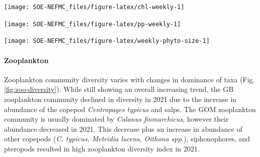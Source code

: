 \documentclass[
  10pt,
]{article}
\let\origfigure\figure
\let\endorigfigure\endfigure
\renewenvironment{figure}[1][2] {
    \expandafter\origfigure\expandafter[H]
} {
    \endorigfigure
}
\begin{document}
\begin{figure}

{\centering \texttt{[image: SOE-NEFMC\_files/figure-latex/chl-weekly-1]} 

}

\caption{Weekly chlorophyll concentrations on Georges Bank (GB) and in the Gulf of Maine (GOM) are shown by the colored line for 2022. The long-term mean is shown in black and shading indicates +/- 1 sample SD.}\label{fig:chl-weekly}
\end{figure}

\begin{figure}

{\centering \texttt{[image: SOE-NEFMC\_files/figure-latex/pp-weekly-1]} 

}

\caption{Weekly primary productivity on Georges Bank (GB) and in the Gulf of Maine (GOM) are shown by the colored line for 2022. The long-term mean is shown in black and shading indicates +/- 1 sample SD.}\label{fig:pp-weekly}
\end{figure}

\begin{figure}

{\centering \texttt{[image: SOE-NEFMC\_files/figure-latex/weekly-phyto-size-1]} 

}

\caption{The annual climatology (1998-2022) percent composition of the phytoplankton size classes on Georges Bank and Gulf of Maine based on satellite observations in the shaded portions. The 2022 proportions for the microplankton (>20 microns, green) and nanoplankton (2-20 microns, orange) are shown in the bold lines.}\label{fig:weekly-phyto-size}
\end{figure}

\hypertarget{zooplankton}{%
\paragraph{Zooplankton}\label{zooplankton}}

Zooplankton community diversity varies with changes in dominance of taxa (Fig. \ref{fig:zoo-diversity}). While still showing an overall increasing trend, the GB zooplankton community declined in diversity in 2021 due to the increase in abundance of the copepod \emph{Centropages typicus} and salps. The GOM zooplankton community is usually dominated by \emph{Calanus finmarchicus}, however their abundance decreased in 2021. This decrease plus an increase in abundance of other copepods (\emph{C. typicus, Metridia lucens, Oithona spp.}), siphonophores, and pteropods resulted in high zooplankton diversity index in 2021.
\end{document}
